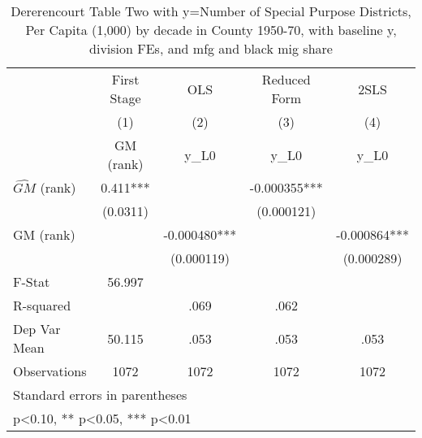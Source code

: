 \begin{table}[htbp]\centering
\def\sym#1{\ifmmode^{#1}\else\(^{#1}\)\fi}
\caption{Dererencourt Table Two with y=Number of Special Purpose Districts, Per Capita (1,000) by decade in County 1950-70, with baseline y, division FEs, and mfg and black mig share}
\begin{tabular}{l*{4}{c}}
\toprule
                    & First Stage   &         OLS   &Reduced Form   &        2SLS   \\
                    &\multicolumn{1}{c}{(1)}&\multicolumn{1}{c}{(2)}&\multicolumn{1}{c}{(3)}&\multicolumn{1}{c}{(4)}\\
                    &\multicolumn{1}{c}{GM  (rank)}&\multicolumn{1}{c}{y\_L0}&\multicolumn{1}{c}{y\_L0}&\multicolumn{1}{c}{y\_L0}\\
\midrule
$\hat{GM}$ (rank)   &       0.411***&               &   -0.000355***&               \\
                    &    (0.0311)   &               &  (0.000121)   &               \\
\addlinespace
GM  (rank)          &               &   -0.000480***&               &   -0.000864***\\
                    &               &  (0.000119)   &               &  (0.000289)   \\
\midrule
F-Stat              &      56.997   &               &               &               \\
R-squared           &               &        .069   &        .062   &               \\
Dep Var Mean        &      50.115   &        .053   &        .053   &        .053   \\
Observations        &        1072   &        1072   &        1072   &        1072   \\
\bottomrule
\multicolumn{5}{l}{\footnotesize Standard errors in parentheses}\\
\multicolumn{5}{l}{\footnotesize * p<0.10, ** p<0.05, *** p<0.01}\\
\end{tabular}
\end{table}
